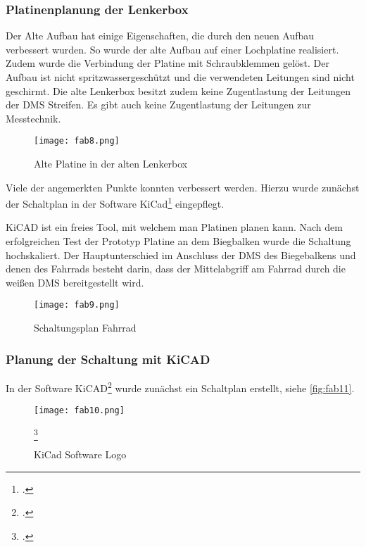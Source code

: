 \subsubsection{Platinenplanung der Lenkerbox}
Der Alte Aufbau hat einige Eigenschaften, die durch den neuen Aufbau verbessert wurden. So wurde der alte Aufbau auf einer Lochplatine realisiert.
Zudem wurde die Verbindung der Platine mit Schraubklemmen gelöst. Der Aufbau ist nicht spritzwassergeschützt und die verwendeten Leitungen sind nicht geschirmt.
Die alte Lenkerbox besitzt zudem keine Zugentlastung der Leitungen der DMS Streifen. Es gibt auch keine Zugentlastung der Leitungen zur Messtechnik. 
\begin{figure}[h]
    \begin{center}
        \texttt{[image: fab8.png]}
        \caption[Alte Platine in der alten Lenkerbox (Abbildungsverzeichnis)]{Alte Platine in der alten Lenkerbox}
        
        \label{fig:fab8}
    \end{center}
\end{figure}

Viele der angemerkten Punkte konnten verbessert werden. Hierzu wurde zunächst der Schaltplan in der Software KiCad\footcite{www.kicad.org} eingepflegt.

KiCAD ist ein freies Tool, mit welchem man Platinen planen kann. Nach dem erfolgreichen Test der Prototyp Platine an dem Biegbalken wurde die Schaltung hochskaliert. Der Hauptunterschied im Anschluss der DMS des Biegebalkens und denen des Fahrrads besteht darin, dass der Mittelabgriff am Fahrrad durch die weißen DMS bereitgestellt wird.
\begin{figure}[h]
    \begin{center}
        \texttt{[image: fab9.png]}
        \caption[Schaltungsplan Fahrrad (Abbildungsverzeichnis)]{Schaltungsplan Fahrrad}
        
        \label{fig:fab9}
    \end{center}
\end{figure}

\subsubsection{Planung der Schaltung mit KiCAD}
In der Software KiCAD\footcite{www.kicad.org} wurde zunächst ein Schaltplan erstellt, siehe \ref{fig:fab11}.
\begin{figure}[h]
    \begin{center}
        \texttt{[image: fab10.png]}
        \caption[KiCad Software Logo (Abbildungsverzeichnis)]{KiCad Software Logo}
        \footcite{www.kicad.org}
        \label{fig:fab10}
    \end{center}
\end{figure}



